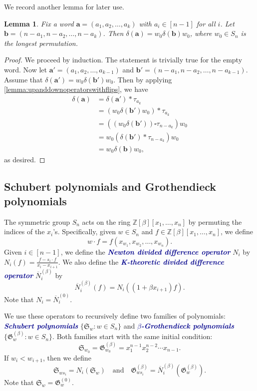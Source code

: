 \documentclass[12 pt]{amsart}
\newcommand{\newword}[1]{\textcolor{darkblue}{\textbf{\emph{#1}}}}
\newtheorem{lemma}[Theorem]{Lemma}
\numberwithin{equation}{section}
\theoremstyle{remark}
\newcommand{\demprod}{\delta}
\newcommand{\divdiff}{N}
\newcommand{\kdivdiff}{\overline{N}}
\begin{document}
	We record another lemma for later use.
	\begin{lemma}
		\label{lemma:conjugationandwords}
		Fix a word $\mathbf{a}=(a_1, a_2,\ldots,a_k)$ with $a_i\in[n-1]$ for all $i$. 
		Let $\mathbf{b}=(n-a_1,n-a_{2},\ldots,n-a_k)$. Then $\demprod(\mathbf{a})=w_0\demprod(\mathbf{b}) w_0$, where $w_0\in S_n$ is the longest permutation.
	\end{lemma}
\begin{proof}
	We proceed by induction. The statement is trivially true for the empty word.
	Now let $\mathbf{a'}=(a_1, a_2,\ldots,a_{k-1})$ and $\mathbf{b'}=(n-a_1,n-a_{2},\ldots,n-a_{k-1})$. 
	Assume that $\demprod(\mathbf{a'})=w_0\demprod(\mathbf{b'})w_0$. 
	Then by applying \cref{lemma:upanddownoperatorswithflips}, we have
	\begin{align*}
		\demprod(\mathbf{a})&=\demprod(\mathbf{a'})*\tau_{a_{k}}\\
		&=(w_0\demprod(\mathbf{b'})w_0)*\tau_{a_k}\\
		&=((w_0\demprod(\mathbf{b'}))\square \tau_{n-a_k})w_0\\
		&=w_0 (\demprod(\mathbf{b'})*\tau_{n-a_k})w_0\\
		&=w_0\demprod(\mathbf{b}) w_0,
	\end{align*}
	as desired.
\end{proof}

	
	\subsection{Schubert polynomials and Grothendieck polynomials}
	
	The symmetric group $S_n$ acts on the ring $\mathbb{Z}[\beta][x_1, \ldots, x_n]$ by permuting the indices of the $x_i$'s. Specifically, given $w \in S_n$ and $f \in \mathbb{Z}[\beta][x_1, \ldots, x_n]$, we define 
	\[w\cdot f = f(x_{w_1}, x_{w_2}, \ldots, x_{w_n}).
	\]
	Given $i \in [n - 1]$, we define the \newword{Newton divided difference operator} $\divdiff_i$ by $\divdiff_i(f) = \frac{f - s_i \cdot f}{x_i - x_{i + 1}}$. 
	We also define the \newword{K-theoretic divided difference operator} $\kdivdiff^{(\beta)}_i$ by 
	\[\kdivdiff^{(\beta)}_i(f) = \divdiff_i \left((1 + \beta x_{i + 1})f \right).\]
	Note that $\divdiff_i = \kdivdiff^{(0)}_i$. 
	
	
	We use these operators to recursively define two families of polynomials: \newword{Schubert polynomials} $\{\mathfrak{S}_w : w \in S_n\}$ and \newword{$\beta$-Grothendieck polynomials} $\{\mathfrak{G}^{(\beta)}_w : w \in S_n\}$.
	Both families start with the same initial condition:
	\[\mathfrak{S}_{w_0} = \mathfrak{G}^{(\beta)}_{w_0} = x_1^{n-1 }x_2^{n-2} \cdots x_{n-1}.\]
	If $w_i < w_{i + 1}$, then we define
	\[
	\mathfrak{S}_{w s_i} = \divdiff_i(\mathfrak{S}_w)
	\quad \text{and} \quad
	\mathfrak{G}^{(\beta)}_{w s_i} = \kdivdiff^{(\beta)}_i(\mathfrak{G}^{(\beta)}_w).
	\]
	Note that $\mathfrak{S}_w = \mathfrak{G}^{(0)}_{w}$.
	
\end{document}
